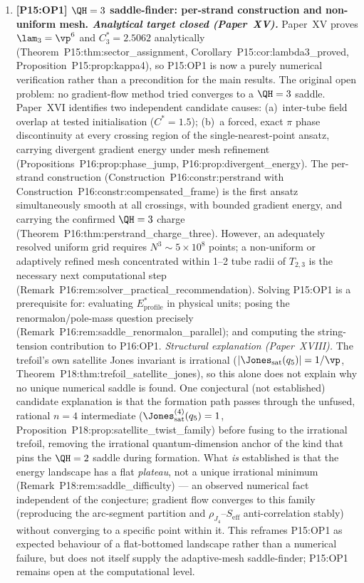 \begin{enumerate}[label=,leftmargin=*]
\item \textbf{[P15:OP1] $\QH=3$ saddle-finder: per-strand construction and non-uniform mesh. \emph{Analytical target closed (Paper~XV).}}
Paper~XV proves $\lam_3=\vp^6$ and $C_3^*=2.5062$ analytically
(Theorem~P15:thm:sector\_assignment, Corollary~P15:cor:lambda3\_proved, Proposition~P15:prop:kappa4),
so P15:OP1 is now a purely numerical verification rather than a precondition for the main results.
The original open problem: no gradient-flow method tried converges to a $\QH=3$ saddle.
Paper~XVI identifies two independent candidate causes: (a)~inter-tube field overlap at tested
initialisation ($C^*=1.5$); (b)~a forced, exact $\pi$ phase discontinuity at every crossing
region of the single-nearest-point ansatz, carrying divergent gradient energy under mesh refinement
(Propositions~P16:prop:phase\_jump, P16:prop:divergent\_energy).
The per-strand construction (Construction~P16:constr:perstrand with Construction~P16:constr:compensated\_frame)
is the first ansatz simultaneously smooth at all crossings, with bounded gradient energy, and
carrying the confirmed $\QH=3$ charge (Theorem~P16:thm:perstrand\_charge\_three). However, an
adequately resolved uniform grid requires $N^3\sim5\times10^8$ points; a non-uniform or
adaptively refined mesh concentrated within 1--2 tube radii of $T_{2,3}$ is the necessary next
computational step (Remark~P16:rem:solver\_practical\_recommendation). Solving P15:OP1 is a
prerequisite for: evaluating $E_{\mathrm{profile}}^*$ in physical units; posing the
renormalon/pole-mass question precisely (Remark~P16:rem:saddle\_renormalon\_parallel); and computing
the string-tension contribution to P16:OP1.
\emph{Structural explanation (Paper~XVIII).} The trefoil's own satellite Jones invariant is
irrational ($|\Jones_{\mathrm{sat}}(q_5)|=1/\vp$, Theorem~P18:thm:trefoil\_satellite\_jones), so
this alone does not explain why no unique numerical saddle is found. One conjectural (not
established) candidate explanation is that the formation path passes through the unfused, rational
$n=4$ intermediate ($\Jones_{\mathrm{sat}}^{(4)}(q_5)=1$,
Proposition~P18:prop:satellite\_twist\_family) before fusing to the irrational trefoil, removing the
irrational quantum-dimension anchor of the kind that pins the $\QH=2$ saddle during formation. What
\emph{is} established is that the energy landscape has a flat \emph{plateau}, not a unique
irrational minimum (Remark~P18:rem:saddle\_difficulty) --- an observed numerical fact independent of
the conjecture; gradient flow converges to this family (reproducing the arc-segment partition and
$\rho_{J_4}$--$S_{\mathrm{eff}}$ anti-correlation stably) without converging to a specific point
within it. This reframes P15:OP1 as expected behaviour of a flat-bottomed landscape rather than a
numerical failure, but does not itself supply the adaptive-mesh saddle-finder; P15:OP1 remains open
at the computational level.


\end{enumerate}
